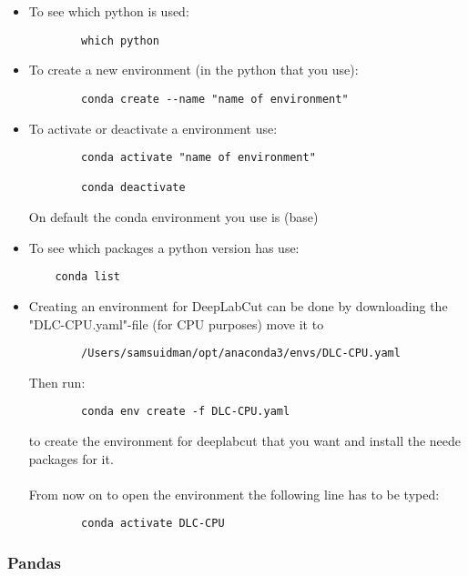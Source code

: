 \documentclass{article}
\begin{document}
\begin{itemize}
    \item To see which python is used:
    \begin{verbatim}
        which python
    \end{verbatim}

    \item To create a new environment (in the python that you use):
    \begin{verbatim}
        conda create --name "name of environment"
    \end{verbatim}
    
    \item To activate or deactivate a environment use:
    \begin{verbatim}
        conda activate "name of environment"
        
        conda deactivate
    \end{verbatim}
    On default the conda environment you use is (base)
    
    \item To see which packages a python version has use:
    \begin{verbatim}
    conda list
    \end{verbatim}
    
    \item Creating an environment for DeepLabCut can be done by downloading the "DLC-CPU.yaml"-file (for CPU purposes) move it to 
    \begin{verbatim}
        /Users/samsuidman/opt/anaconda3/envs/DLC-CPU.yaml    
    \end{verbatim} 
    Then run:
    \begin{verbatim}
        conda env create -f DLC-CPU.yaml
    \end{verbatim}
    to create the environment for deeplabcut that you want and install the neede packages for it. \\ \\
    From now on to open the environment the following line has to be typed:
    \begin{verbatim}
        conda activate DLC-CPU
    \end{verbatim}
    
    
\end{itemize}



\subsubsection{Pandas}
\end{document}

